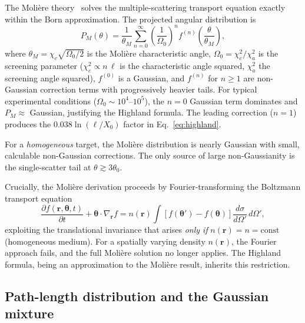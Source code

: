 \documentclass[final,5p,times,twocolumn]{elsarticle}
\begin{document}
The Moli\`{e}re theory~\cite{Moliere1947,Moliere1948} solves the multiple-scattering transport equation exactly within the Born approximation.  The projected angular distribution is
\begin{equation}
  P_M(\theta) = \frac{1}{\theta_M}\sum_{n=0}^{\infty}\left(\frac{1}{\Omega_0}\right)^{\!n} f^{(n)}\!\left(\frac{\theta}{\theta_M}\right),
  \label{eq:moliere}
\end{equation}
where $\theta_M = \chi_c\sqrt{\Omega_0/2}$ is the Moli\`{e}re characteristic angle, $\Omega_0 = \chi_c^2/\chi_a^2$ is the screening parameter ($\chi_c^2 \propto n\,\ell$ is the characteristic angle squared, $\chi_a^2$ the screening angle squared), $f^{(0)}$ is a Gaussian, and $f^{(n)}$ for $n\geq 1$ are non-Gaussian correction terms with progressively heavier tails.  For typical experimental conditions ($\Omega_0\sim 10^4$--$10^5$), the $n=0$ Gaussian term dominates and $P_M\approx$ Gaussian, justifying the Highland formula.  The leading correction ($n=1$) produces the $0.038\ln(\ell/X_0)$ factor in Eq.~\eqref{eq:highland}.

For a \emph{homogeneous} target, the Moli\`{e}re distribution is nearly Gaussian with small, calculable non-Gaussian corrections.  The only source of large non-Gaussianity is the single-scatter tail at $\theta\gtrsim 3\theta_0$.

Crucially, the Moli\`{e}re derivation proceeds by Fourier-transforming the Boltzmann transport equation
\begin{equation}
  \frac{\partial f(\mathbf{r},\bm{\theta},t)}{\partial t} + \bm{\theta}\cdot\nabla_{\mathbf{r}}f = n(\mathbf{r})\int\left[f(\bm{\theta}')-f(\bm{\theta})\right]\frac{d\sigma}{d\Omega'}\,d\Omega',
  \label{eq:transport}
\end{equation}
exploiting the translational invariance that arises \emph{only if} $n(\mathbf{r})=n=\text{const}$ (homogeneous medium).  For a spatially varying density $n(\mathbf{r})$, the Fourier approach fails, and the full Moli\`{e}re solution no longer applies.  The Highland formula, being an approximation to the Moli\`{e}re result, inherits this restriction.

\subsection{Path-length distribution and the Gaussian mixture}
\label{sec:mixture}
\end{document}
